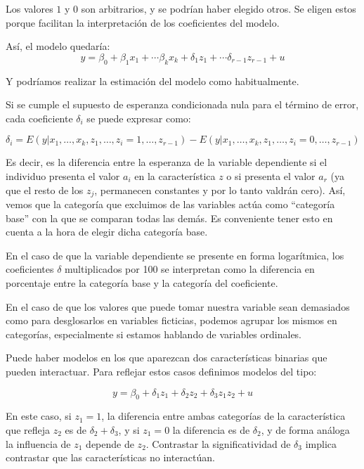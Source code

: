 Los valores $1$ y $0$ son arbitrarios, y se podr\'ian haber elegido otros. Se eligen estos porque facilitan la interpretaci\'on de los coeficientes del modelo.

As\'i, el modelo quedar\'ia:
\[y=\beta_0+\beta_1x_1+\cdots\beta_kx_k+\delta_1z_1+\cdots\delta_{r-1}z_{r-1}+u\]

Y podr\'iamos realizar la estimaci\'on del modelo como habitualmente.


Si se cumple el supuesto de esperanza condicionada nula para el t\'ermino de error, cada coeficiente $\delta_i$ se puede expresar como:

\[\delta_i=E(y|x_1,\ldots,x_k,z_1,\ldots,z_i=1,\ldots,z_{r-1})-E(y|x_1,\ldots,x_k,z_1,\ldots,z_i=0,\ldots,z_{r-1})\]

Es decir, es la diferencia entre la esperanza de la variable dependiente si el individuo presenta el valor $a_i$ en la caracter\'istica $z$ o si presenta el valor $a_r$ (ya que el resto de los $z_j$, permanecen constantes y por lo tanto valdr\'an cero). As\'i, vemos que la categor\'ia que excluimos de las variables act\'ua como ``categor\'ia base'' con la que se comparan todas las dem\'as. Es conveniente tener esto en cuenta a la hora de elegir dicha categor\'ia base.

En el caso de que la variable dependiente se presente en forma logar\'itmica, los coeficientes $\delta$ multiplicados por 100 se interpretan como la diferencia en porcentaje entre la categor\'ia base y la categor\'ia del coeficiente.

En el caso de que los valores que puede tomar nuestra variable sean demasiados como para desglosarlos en variables ficticias, podemos agrupar los mismos en categor\'ias, especialmente si estamos hablando de variables ordinales.




Puede haber modelos en los que aparezcan dos caracter\'isticas binarias que pueden interactuar. Para reflejar estos casos definimos modelos del tipo:

\[y=\beta_0+\delta_1z_1+\delta_2z_2+\delta_3z_1z_2+u\]

En este caso, si $z_1=1$, la diferencia entre ambas categor\'ias de la caracter\'istica que refleja $z_2$ es de $\delta_2+\delta_3$, y si $z_1=0$ la diferencia es de $\delta_2$, y de forma an\'aloga la influencia de $z_1$ depende de $z_2$. Contrastar la significatividad de $\delta_3$ implica contrastar que las caracter\'isticas no interact\'uan.

